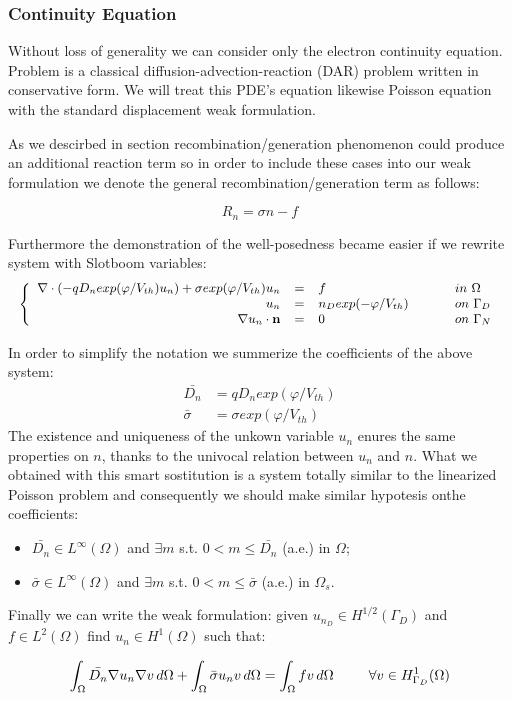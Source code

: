 \subsubsection{Continuity Equation}

Without loss of generality we can consider only the electron continuity equation. Problem  is a classical diffusion-advection-reaction (DAR) problem written in conservative form. We will treat this PDE's equation likewise Poisson equation with the standard displacement weak formulation.

As we descirbed in section  recombination/generation phenomenon could produce an additional reaction term so in order to include these cases into our weak formulation we denote the general recombination/generation term as follows:

\begin{equation}
R_n = \sigma n - f
\end{equation}

Furthermore the demonstration of the well-posedness became easier if we rewrite system  with Slotboom variables:
\begin{equation}
\small
\left\{
\begin{array}{rcll}
 \nabla \cdot \left( - q D_n exp(\varphi/V_{th}) u_n \right) + \sigma exp(\varphi/V_{th}) u_n& = & f  & \psp{15} in \psp{2} \Omega \\
u_n & = &  n_D exp(-\varphi/V_{th}) & \psp{15} on \psp{2} \Gamma_D \\
\nabla u_n \cdot \vect{n} & = & 0 & \psp{15} on \psp{2} \Gamma_N
\end{array}
\right.
\end{equation}

In order to simplify the notation we summerize the coefficients of the above system:
\begin{align*}
\bar{D_n} & = q D_n exp(\varphi/V_{th}) \\
\bar{\sigma}  & = \sigma exp(\varphi/V_{th})
\end{align*}
The existence and uniqueness of the unkown variable $u_n$ enures the same properties on $n$, thanks to the univocal relation between $u_n$ and $n$.
What we obtained with this smart sostitution is a system totally similar to the linearized Poisson problem and consequently we should make similar hypotesis onthe coefficients:
\begin{itemize}
\item $\bar{D_n} \in L^{\infty}(\Omega)$ and $\exists m$ s.t. $0 < m \leq \bar{D_n}$ (a.e.) in $\Omega$;
\item  $\bar{\sigma} \in L^{\infty}(\Omega)$ and $\exists m$ s.t. $0 < m \leq \bar{\sigma}$ (a.e.) in $\Omega_s$.
\end{itemize}
Finally we can write the weak formulation: given $u_{n_D} \in H^{1/2}(\Gamma_D)$ and $f \in L^2(\Omega)$ find $u_n \in H^1(\Omega)$ such that:

\begin{equation}
\label{eq: LEC weakformulation}
\int_{\Omega} \bar{D_n} \nabla u_n \nabla v \, d\Omega + \int_{\Omega} \bar{\sigma} u_n v \, d\Omega = \int_{\Omega} f v \, d\Omega \psp{15} \forall v \in H^1_{\Gamma_D}(\Omega)
\end{equation}
